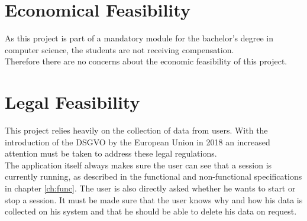 \section{Economical Feasibility}
\label{Economical Feasibility}
As this project is part of a mandatory module for the bachelor's degree in computer science, the students are not receiving compensation.\\
Therefore there are no concerns about the economic feasibility of this project.

\section{Legal Feasibility}
\label{Legal Feasibility}
This project relies heavily on the collection of data from \glspl{user}. With the introduction of the DSGVO by the European Union in 2018 an increased attention must be taken to address these legal regulations.\\
The application itself always makes sure the \gls{user} can see that a \gls{session} is currently running, as described in the functional and non-functional specifications in chapter \ref{ch:func}. The \gls{user} is also directly asked whether he wants to start or stop a \gls{session}.
It must be made sure that the \gls{user} knows why and how his data is collected on his system and that he should be able to delete his data on request.


